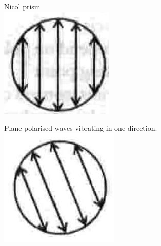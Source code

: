 \documentclass[10pt]{article}
\begin{document}
Nicol prism\\
\includegraphics[max width=\textwidth, center]{2025_01_28_8470952b98110cec3aabg-048(3)}

Plane polarised waves vibrating in one direction.\\
\includegraphics[max width=\textwidth, center]{2025_01_28_8470952b98110cec3aabg-048(4)}
\end{document}
